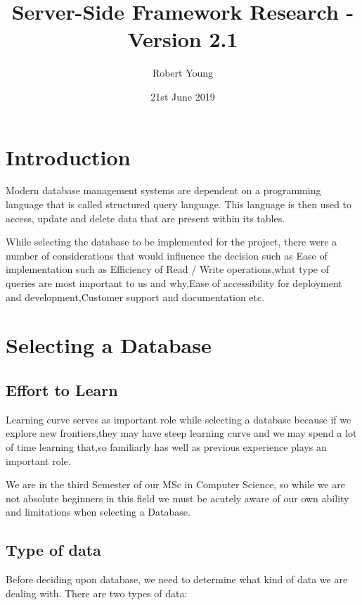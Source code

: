 \documentclass{article}
\title{Server-Side Framework Research - Version 2.1}
\author{Robert Young}
\date{21st June 2019}
\begin{document}
\maketitle

\tableofcontents

\newpage

\section{Introduction}

Modern database management systems are dependent on a programming language that is called structured query language. This language is then used to access, update and delete data that are present within its tables.  

While selecting the database to be implemented for the project, there were a number of considerations that would influence the decision such as Ease of implementation such as Efficiency of Read / Write operations,what type of queries are most important to us and why,Ease of accessibility for deployment and development,Customer support and documentation etc.

\section{Selecting a Database}

\subsection{Effort to Learn}

Learning curve serves as important role while selecting a database because if we explore new frontiers,they may have steep learning curve and we may spend a lot of time learning that,so familiarly has well as previous experience plays an important role. 

We are in the third Semester of our MSc in Computer Science, so while we are not absolute beginners in this field we must be acutely aware of our own ability and limitations when selecting a Database.

\subsection{Type of data}

Before deciding upon database, we need to determine what kind of data we are dealing with.
There are two types of data:
\end{document}
